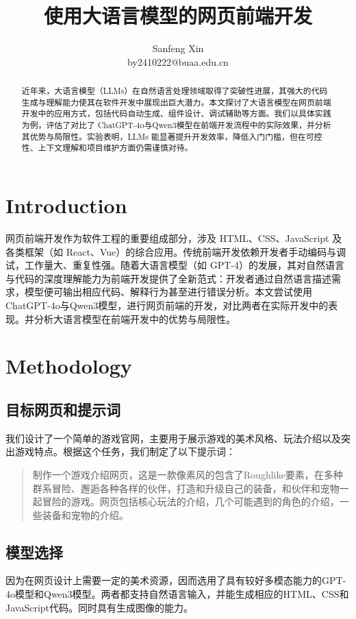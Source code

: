 \documentclass[12pt]{article}
\title{\fontsize{14}{16}\bfseries 使用大语言模型的网页前端开发}
\author{\small Sanfeng Xin\\ \small by2410222@buaa.edu.cn}
\date{}
\begin{document}
\maketitle
\renewcommand{\abstractname}{\textbf{\Large Abstract}} %
\begin{abstract}
    近年来，大语言模型（LLMs）在自然语言处理领域取得了突破性进展，其强大的代码生成与理解能力使其在软件开发中展现出巨大潜力。本文探讨了大语言模型在网页前端开发中的应用方式，包括代码自动生成、组件设计、调试辅助等方面。我们以具体实践为例，评估了对比了 ChatGPT-4o\cite{openai2024gpt4ocard}与Qwen3\cite{yang2025qwen3technicalreport}模型在前端开发流程中的实际效果，并分析其优势与局限性。实验表明，LLMs 能显著提升开发效率，降低入门门槛，但在可控性、上下文理解和项目维护方面仍需谨慎对待。
\end{abstract}

\section*{\centering Introduction}
网页前端开发作为软件工程的重要组成部分，涉及 HTML、CSS、JavaScript 及各类框架（如 React、Vue）的综合应用。传统前端开发依赖开发者手动编码与调试，工作量大、重复性强。随着大语言模型（如 GPT-4）的发展，其对自然语言与代码的深度理解能力为前端开发提供了全新范式：开发者通过自然语言描述需求，模型便可输出相应代码、解释行为甚至进行错误分析。本文尝试使用ChatGPT-4o与Qwen3模型，进行网页前端的开发，对比两者在实际开发中的表现。并分析大语言模型在前端开发中的优势与局限性。
\section*{\centering Methodology}

\subsection*{\centering 目标网页和提示词}
我们设计了一个简单的游戏官网，主要用于展示游戏的美术风格、玩法介绍以及突出游戏特点。根据这个任务，我们制定了以下提示词：
\begin{quote}
    制作一个游戏介绍网页，这是一款像素风的包含了Roughlike要素，在多种群系冒险、邂逅各种各样的伙伴，打造和升级自己的装备，和伙伴和宠物一起冒险的游戏。网页包括核心玩法的介绍，几个可能遇到的角色的介绍，一些装备和宠物的介绍。
\end{quote}

\subsection*{\centering 模型选择}
因为在网页设计上需要一定的美术资源，因而选用了具有较好多模态能力的GPT-4o模型和Qwen3模型。两者都支持自然语言输入，并能生成相应的HTML、CSS和JavaScript代码。同时具有生成图像的能力。
\end{document}
